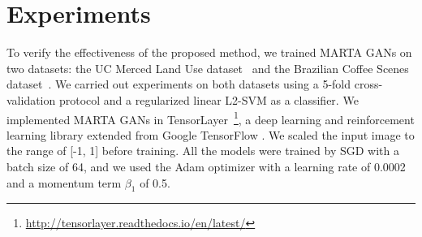 \documentclass[journal]{IEEEtran}
\begin{document}
\section{Experiments}
\label{subsect:experiments}
To verify the effectiveness of the proposed method, we trained MARTA GANs on two datasets: the UC Merced Land Use dataset~\cite{yang2010bag} and the Brazilian Coffee Scenes dataset~\cite{penatti2015deep}. We carried out experiments on both datasets using a 5-fold cross-validation protocol and a regularized linear L2-SVM as a classifier. We implemented MARTA GANs in TensorLayer~\footnote{\url{http://tensorlayer.readthedocs.io/en/latest/}}, a deep learning and reinforcement learning library extended from Google TensorFlow \cite{abadi2016tensorflow}. We scaled the input image to the range of [-1, 1] before training. All the models were trained by SGD with a batch size of 64, and we used the Adam optimizer with a learning rate of 0.0002 and a momentum term $\beta_1$ of 0.5.

\end{document}
